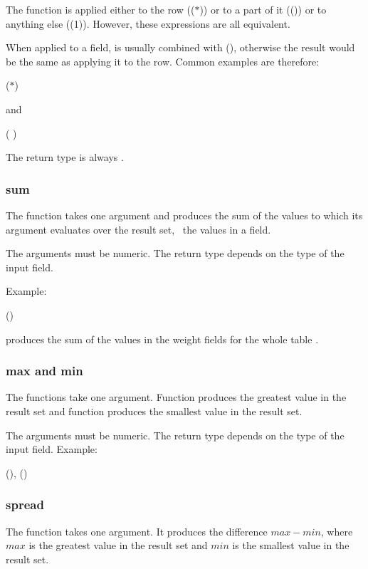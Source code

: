 The function is applied either to the row (($\ast$))
or to a part of it (())
or to anything else ((1)).
However, these expressions are all equivalent.
 
When applied to a field,  is usually combined with
 (),
otherwise the result would be the same as applying it to the row.
Common examples are therefore:

 ($\ast$)  

and

 ( )
 

The return type is always .

\subsubsection{sum}
The function takes one argument and
produces the sum of the values
to which its argument evaluates over the result set,
\eg\ the values in a field.

The arguments must be numeric.
The return type depends on the type of the input field.

Example:

 ()  

produces the sum of the values in the weight fields
for the whole table .

\subsubsection{max and min}
The functions take one argument.
Function  produces the greatest value in the result set
and function  produces the smallest value in the result set.

The arguments must be numeric.
The return type depends on the type of the input field.
Example:

 (),
                 ()
 

\subsubsection{spread}
The function takes one argument.
It produces the difference $max - min$,
where $max$ is the greatest value in the result set
and $min$ is the smallest value in the result set.

